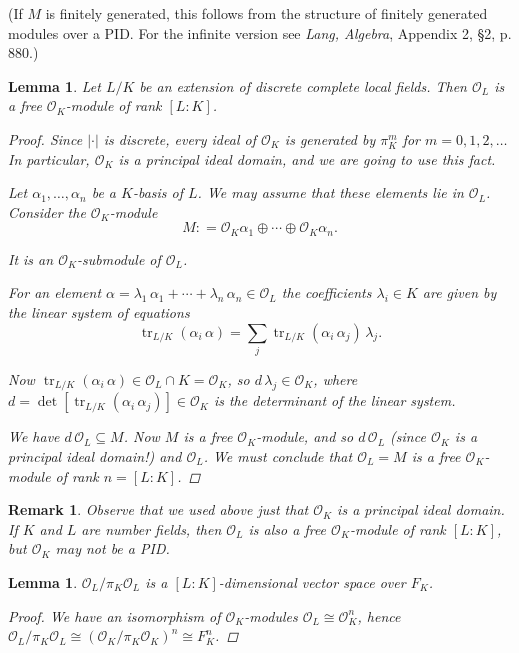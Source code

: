 \documentclass{article}
\newcommand{\isom}{\cong}
\newcommand{\dfn}{\mathrel{\mathop:}=}
\DeclareMathOperator{\tr}{tr}
\theoremstyle{myplain}
\newtheorem{lemma}[proposition]{Lemma}
\theoremstyle{mydefinition}
\newtheorem{remark}[proposition]{Remark}
\begin{document}
\noindent (If $M$ is finitely generated, this follows from the structure of
finitely generated modules over a PID. For the infinite version see
\emph{Lang, Algebra}, Appendix 2, \S 2, p. 880.)

\begin{lemma}
  Let $L/K$ be an extension of discrete complete local fields. Then $\mathcal{O}_L$ is a
  free $\mathcal{O}_K$-module of rank $[L:K]$.

  \begin{proof}
    Since $|\cdot|$ is discrete, every ideal of $\mathcal{O}_K$ is generated by $\pi_K^m$
    for $m = 0, 1, 2, \ldots$ In particular, $\mathcal{O}_K$ is a principal ideal domain,
    and we are going to use this fact.

    Let $\alpha_1, \ldots, \alpha_n$ be a $K$-basis of $L$. We may assume that
    these elements lie in $\mathcal{O}_L$. Consider the $\mathcal{O}_K$-module
    \[ M \dfn \mathcal{O}_K \alpha_1 \oplus \cdots \oplus \mathcal{O}_K \alpha_n. \]

    It is an $\mathcal{O}_K$-submodule of $\mathcal{O}_L$.

    For an element
    $\alpha = \lambda_1 \, \alpha_1 + \cdots + \lambda_n \, \alpha_n \in \mathcal{O}_L$
    the coefficients $\lambda_i \in K$ are given by the linear system of
    equations
    \[ \tr_{L/K} (\alpha_i\,\alpha) = \sum_j \tr_{L/K} (\alpha_i\,\alpha_j)\,\lambda_j. \]

    Now $\tr_{L/K} (\alpha_i\,\alpha) \in \mathcal{O}_L\cap K = \mathcal{O}_K$, so
    $d\,\lambda_j \in \mathcal{O}_K$, where
    $d = \det [\tr_{L/K} (\alpha_i\,\alpha_j)] \in \mathcal{O}_K$ is the determinant of
    the linear system.

    We have $d\,\mathcal{O}_L \subseteq M$. Now $M$ is a free $\mathcal{O}_K$-module, and so
    $d\,\mathcal{O}_L$ (since $\mathcal{O}_K$ is a principal ideal domain!) and $\mathcal{O}_L$. We must
    conclude that $\mathcal{O}_L = M$ is a free $\mathcal{O}_K$-module of rank $n = [L : K]$.
  \end{proof}
\end{lemma}

\begin{remark}
  Observe that we used above just that $\mathcal{O}_K$ is a principal ideal domain.
  If $K$ and $L$ are number fields, then $\mathcal{O}_L$ is also a free $\mathcal{O}_K$-module of
  rank $[L:K]$, but $\mathcal{O}_K$ may not be a PID.
\end{remark}

\begin{lemma}
  $\mathcal{O}_L / \pi_K \mathcal{O}_L$ is a $[L:K]$-dimensional vector space over $F_K$.

  \begin{proof}
    We have an isomorphism of $\mathcal{O}_K$-modules $\mathcal{O}_L \isom \mathcal{O}_K^n$, hence
    $\mathcal{O}_L/\pi_K \mathcal{O}_L \isom (\mathcal{O}_K/\pi_K \mathcal{O}_K)^n \isom F_K^n$.
  \end{proof}
\end{lemma}
\end{document}
